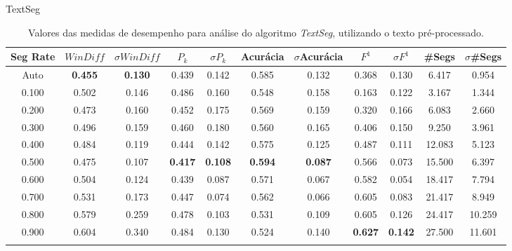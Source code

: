  \newpage
\center TextSeg
\begin{longtable}[c]{|c|c|c|c|c|c|c|c|c|c|c|} 
\hline 
 Seg Rate & $WinDiff$ & $\sigma$$WinDiff$ & $P_k$ & $\sigma$$P_k$ & Acurácia & $\sigma$Acurácia & $F^1$ & $\sigma$$F^1$ & \#Segs & $\sigma$\#Segs\\ \hline 
 Auto & \cellcolor{gray!20} \textbf{0.455} & \cellcolor{gray!20} \textbf{0.130} & 0.439 & 0.142 & 0.585 & 0.132 & 0.368 & 0.130 & 6.417 & 0.954  \\ \hline 
  0.100 & 0.502 & 0.146 & 0.486 & 0.160 & 0.548 & 0.158 & 0.163 & 0.122 & 3.167 & 1.344  \\ \hline 
  0.200 & 0.473 & 0.160 & 0.452 & 0.175 & 0.569 & 0.159 & 0.320 & 0.166 & 6.083 & 2.660  \\ \hline 
  0.300 & 0.496 & 0.159 & 0.460 & 0.180 & 0.560 & 0.165 & 0.406 & 0.150 & 9.250 & 3.961  \\ \hline 
  0.400 & 0.484 & 0.119 & 0.444 & 0.142 & 0.575 & 0.125 & 0.487 & 0.111 & 12.083 & 5.123  \\ \hline 
  0.500 & 0.475 & 0.107 & \cellcolor{gray!20} \textbf{0.417} & \cellcolor{gray!20} \textbf{0.108} & \cellcolor{gray!20} \textbf{0.594} & \cellcolor{gray!20} \textbf{0.087} & 0.566 & 0.073 & 15.500 & 6.397  \\ \hline 
  0.600 & 0.504 & 0.124 & 0.439 & 0.087 & 0.571 & 0.067 & 0.582 & 0.054 & 18.417 & 7.794  \\ \hline 
  0.700 & 0.531 & 0.173 & 0.447 & 0.074 & 0.562 & 0.066 & 0.605 & 0.083 & 21.417 & 8.949  \\ \hline 
  0.800 & 0.579 & 0.259 & 0.478 & 0.103 & 0.531 & 0.109 & 0.605 & 0.126 & 24.417 & 10.259  \\ \hline 
  0.900 & 0.604 & 0.340 & 0.484 & 0.130 & 0.524 & 0.140 & \cellcolor{gray!20} \textbf{0.627} & \cellcolor{gray!20} \textbf{0.142} & 27.500 & 11.601  \\ \hline 
 \caption{Valores das medidas de desempenho para análise do algoritmo \textit{TextSeg}, utilizando o texto pré-processado.}
 \end{longtable} 


 
